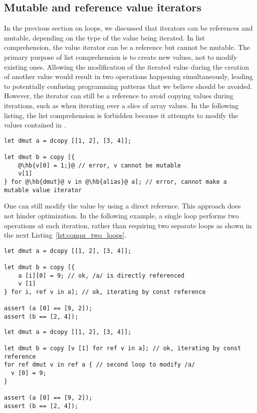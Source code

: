 \subsection{Mutable and reference value iterators}

In the previous section on  loops, we discussed that iterators can be
references and mutable, depending on the type of the value being iterated. In
list comprehension, the value iterator can be a reference but cannot be mutable.
The primary purpose of list comprehension is to create new values, not to modify
existing ones. Allowing the modification of the iterated value during the
creation of another value would result in two operations happening
simultaneously, leading to potentially confusing programming patterns that we
believe should be avoided. However, the iterator can still be a reference to
avoid copying values during iterations, such as when iterating over a slice of
array values. In the following listing, the list comprehension is forbidden
because it attempts to modify the values contained in .

\begin{lstlisting}[style=coloredverbatim, escapechar=@]
let dmut a = dcopy [[1, 2], [3, 4]];

let dmut b = copy [{
    @\hb{v[0] = 1;}@ // error, v cannot be mutable
    v[1]
} for @\hb{dmut}@ v in @\hb{alias}@ a]; // error, cannot make a mutable value iterator
\end{lstlisting}

One can still modify the value  by using a direct reference. This
approach does not hinder optimization. In the following example, a single loop
performs two operations at each iteration, rather than requiring two separate
loops as shown in the next Listing~\ref{lst:compr_two_loops}.

\begin{lstlisting}[style=coloredverbatim, caption=Modify existing value during list comprehension]
let dmut a = dcopy [[1, 2], [3, 4]];

let dmut b = copy [{
    a [i][0] = 9; // ok, /a/ is directly referenced
    v [1]
} for i, ref v in a]; // ok, iterating by const reference

assert (a [0] == [9, 2]);
assert (b == [2, 4]);
\end{lstlisting}

\begin{lstlisting}[style=coloredverbatim, caption=Using two loops]
let dmut a = dcopy [[1, 2], [3, 4]];

let dmut b = copy [v [1] for ref v in a]; // ok, iterating by const reference
for ref dmut v in ref a { // second loop to modify /a/
  v [0] = 9;
}

assert (a [0] == [9, 2]);
assert (b == [2, 4]);
\end{lstlisting}

